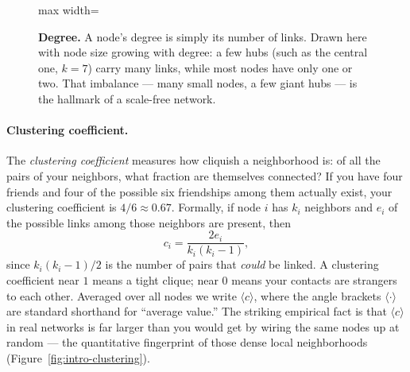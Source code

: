 \begin{figure}[t]
\centering
\begin{adjustbox}{max width=\linewidth}\end{adjustbox}
\caption{\textbf{Degree.} A node's degree is simply its number of links. Drawn
here with node size growing with degree: a few hubs (such as the central one,
$k=7$) carry many links, while most nodes have only one or two. That imbalance ---
many small nodes, a few giant hubs --- is the hallmark of a scale-free
network.}
\label{fig:intro-degree}
\end{figure}

\paragraph{Clustering coefficient.}
The \emph{clustering coefficient} measures how cliquish a neighborhood is: of all
the pairs of your neighbors, what fraction are themselves connected? If you have four friends and
four of the possible six friendships among them actually exist, your clustering
coefficient is $4/6 \approx 0.67$. Formally, if node $i$ has $k_i$ neighbors and
$e_i$ of the possible links among those neighbors are present, then
\begin{equation}
  c_i = \frac{2 e_i}{k_i (k_i - 1)},
  \label{eq:intro-clustering}
\end{equation}
since $k_i(k_i-1)/2$ is the number of pairs that \emph{could} be linked. A
clustering coefficient near $1$ means a tight clique; near $0$ means your
contacts are strangers to each other. Averaged over all nodes we write $\langle
c\rangle$, where the angle brackets $\langle\cdot\rangle$ are standard shorthand
for ``average value.'' The striking empirical fact \citep{watts1998} is that
$\langle c\rangle$ in real networks is far larger than you would get by wiring
the same nodes up at random --- the quantitative fingerprint of those dense local
neighborhoods (Figure~\ref{fig:intro-clustering}).

